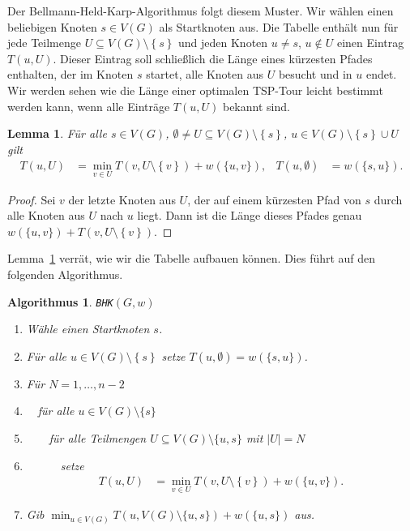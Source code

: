\documentclass[10pt,reqno]{amsart}
\numberwithin{equation}{section}
\newtheorem{lemma}[definition]{Lemma}
\newtheorem{algorithm}[definition]{Algorithmus}
\newcommand\cbc[1]{\left\{{#1}\right\}}
\newcommand\Lem{Lemma}
\begin{document}
Der Bellmann-Held-Karp-Algorithmus folgt diesem Muster.
Wir w\"ahlen einen beliebigen Knoten $s\in V(G)$ als Startknoten aus.
Die Tabelle enth\"alt nun f\"ur jede Teilmenge $U\subseteq V(G)\setminus\cbc s$ und jeden Knoten $u\neq s$, $u\not\in U$ einen Eintrag $T(u,U)$.
Dieser Eintrag soll schlie\ss lich die L\"ange eines k\"urzesten Pfades enthalten, der im Knoten $s$ startet, alle Knoten aus $U$ besucht und in $u$ endet.
Wir werden sehen wie die L\"ange einer optimalen TSP-Tour leicht bestimmt werden kann, wenn alle Eintr\"age $T(u,U)$ bekannt sind.

\begin{lemma}\label{lemma_tsp}
	F\"ur alle $s\in V(G)$, $\emptyset\neq U\subseteq V(G)\setminus\cbc s$, $u\in V(G)\setminus\cbc s\cup U$ gilt
	\begin{align*}
		T(u,U)&=\min_{v\in U}T(v,U\setminus\cbc v)+w(\{u,v\}),&T(u,\emptyset)&=w(\{s,u\}).
	\end{align*}
\end{lemma}
\begin{proof}
	Sei $v$ der letzte Knoten aus $U$, der auf einem k\"urzesten Pfad von $s$ durch alle Knoten aus $U$ nach $u$ liegt.
	Dann ist die L\"ange dieses Pfades genau $w(\{u,v\})+T(v,U\setminus\cbc v)$.
\end{proof}

\Lem~\ref{lemma_tsp} verr\"at, wie wir die Tabelle aufbauen k\"onnen.
Dies f\"uhrt auf den folgenden Algorithmus.

\begin{algorithm}{\tt BHK}$(G,w)$
	\begin{enumerate}
		\item W\"ahle einen Startknoten $s$.
		\item F\"ur alle $u\in V(G)\setminus\cbc s$ setze $T(u,\emptyset)=w(\{s,u\})$.
		\item F\"ur $N=1,\ldots,n-2$
		\item $\quad$f\"ur alle $u\in V(G)\setminus\{s\}$
		\item $\quad\quad$f\"ur alle Teilmengen $U\subseteq V(G)\setminus\{u,s\}$ mit $|U|=N$
		\item $\quad\quad\quad$setze
\begin{align*}
		T(u,U)&=\min_{v\in U}T(v,U\setminus\cbc v)+w(\{u,v\}).
	\end{align*}
\item Gib $\min_{u\in V(G)}T(u,V(G)\setminus\{u,s\})+w(\{u,s\})$ aus.
	\end{enumerate}
\end{algorithm}
\end{document}
